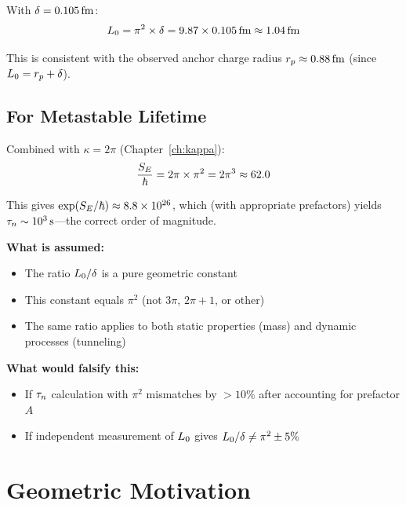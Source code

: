 With $\delta = 0.105\,\mathrm{fm}$:
\begin{equation}
    L_0 = \pi^2 \times \delta = 9.87 \times 0.105\,\mathrm{fm} \approx 1.04\,\mathrm{fm}
\end{equation}

This is consistent with the observed anchor charge radius $r_p \approx 0.88\,\mathrm{fm}$
(since $L_0 = r_p + \delta$).

\subsection{For Metastable Lifetime}

Combined with $\kappa = 2\pi$ (Chapter~\ref{ch:kappa}):
\begin{equation}
    \frac{S_E}{\hbar} = 2\pi \times \pi^2 = 2\pi^3 \approx 62.0
\end{equation}

This gives $\exp(S_E/\hbar) \approx 8.8 \times 10^{26}$, which (with appropriate
prefactors) yields $\tau_n \sim 10^3\,\mathrm{s}$---the correct order of magnitude.

\begin{edcopenbox}[title=Assumption Check: $\pi^2$ Value]
    \textbf{What is assumed:}
    \begin{itemize}
        \item The ratio $L_0/\delta$ is a pure geometric constant
        \item This constant equals $\pi^2$ (not $3\pi$, $2\pi+1$, or other)
        \item The same ratio applies to both static properties (mass) and
              dynamic processes (tunneling)
    \end{itemize}

    \textbf{What would falsify this:}
    \begin{itemize}
        \item If $\tau_n$ calculation with $\pi^2$ mismatches by $>10\%$ after
              accounting for prefactor $A$
        \item If independent measurement of $L_0$ gives
              $L_0/\delta \neq \pi^2 \pm 5\%$
    \end{itemize}
    \tagP
\end{edcopenbox}

\section{Geometric Motivation}
\label{sec:L0delta:geometry}

